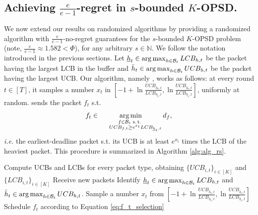 \subsection{Achieving $\frac{e}{e-1}$-regret in $s$-bounded $K$-OPSD.} We now extend our results on randomized algorithms by providing a randomized algorithm with $\frac{e}{e-1}$-no-regret guarantees for the $s$-bounded $K$-OPSD problem (note, $\frac{e}{e-1}\approx 1.582 < \Phi$), for any arbitrary $s \in \mathbb{N}$. We follow the notation introduced in the previous sections. Let $\underline{h}_t \in \operatorname*{arg\,max}_{h \in \mathcal{B}_t} LCB_{h,t}$ be the packet having the largest LCB in the buffer and $\bar{h}_t \in \operatorname*{arg\,max}_{h \in \mathcal{B}_t} UCB_{h,t}$ be the packet having the largest UCB. Our algorithm, namely \algrs, works as follows: at every round $t\in [T]$, it samples a number $x_t$ in $\left[-1+\ln \frac{UCB_{\bar{h}_t,t}}{LCB_{\underline{h}_t,t}},\ln \frac{UCB_{\bar{h}_t,t}}{LCB_{\underline{h}_t,t}}\right]$, uniformly at random. \algrs sends the packet $f_t$ s.t. 
\begin{equation}
\label{eq:f_t_selection}
     f_t \in \argmin_{\substack{%
         f \in \mathcal{B}_t \text{ s.\,t.}\ \\
        \phantom{\text{s.\,t.}}\, UCB_{f,t} \ge e^{x_t} LCB_{\underline{h}_t,t}
    }} d_f,
\end{equation}
\emph{i.e.} the earliest-deadline packet s.t. its UCB is at least $e^{x_t}$ times the LCB of the heaviest packet. This procedure is summarized in Algorithm \ref{alg:alg_rs}.
\begin{algorithm}[t!]
\caption{\algrs}
\label{alg:alg_rs}
\small
\begin{algorithmic}[1]
        \STATE Compute UCBs and LCBs for every packet type, obtaining $\{UCB_{i,t}\}_{i\in [K]}$ and $\{LCB_{i,t}\}_{i\in [K]}$
        \STATE Receive new packets
        \STATE Identify $\underline{h}_t \in \operatorname*{arg\,max}_{h \in \mathcal{B}_t} LCB_{h,t}$ and $\bar{h}_t \in \operatorname*{arg\,max}_{h \in \mathcal{B}_t} UCB_{h,t}$.
        \STATE Sample a number $x_t$ from $\left[-1+\ln \frac{UCB_{\bar{h}_t,t}}{LCB_{\underline{h}_t,t}},\ln \frac{UCB_{\bar{h}_t,t}}{LCB_{\underline{h}_t,t}}\right]$
        \STATE Schedule $f_t$ according to Equation \eqref{eq:f_t_selection}
    \ENDFOR
\end{algorithmic}
\end{algorithm}

